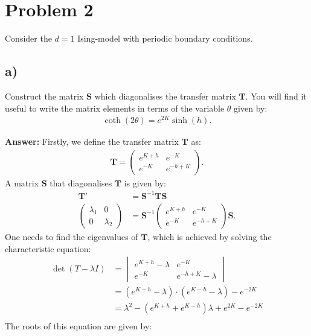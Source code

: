\documentclass[a4paper]{article}
\newcommand{\newparagraph}{\vspace{.5cm}\noindent}
\begin{document}
\section*{Problem 2}
Consider the $d = 1$ Ising-model with periodic boundary conditions.

\subsection*{a)}
Construct the matrix $\mathbf{S}$ which diagonalises the transfer matrix $\mathbf{T}$.
You will find it useful to write the matrix elements in terms of the variable $\theta$ given by:
\begin{align*}
    \coth(2\theta) = e^{2K}\sinh(h).
\end{align*}

\newparagraph
\textbf{Answer:} Firstly, we define the transfer matrix $\mathbf{T}$ as:
\begin{align*}
    \mathbf{T} = \begin{pmatrix}
        e^{K + h} & e^{-K}\\
        e^{-K}\ & e^{-h + K}
    \end{pmatrix}.
\end{align*}A matrix $\mathbf{S}$ that diagonalises $\mathbf{T}$ is given by:
\begin{align}
    \mathbf{T}' &= \mathbf{S}^{-1}\mathbf{T}\mathbf{S}\\
    \begin{pmatrix}
        \lambda_1 & 0\\
        0 & \lambda_2
    \end{pmatrix} &= \mathbf{S}^{-1}\begin{pmatrix}
        e^{K + h} & e^{-K}\\
        e^{-K}\ & e^{-h + K}
    \end{pmatrix}\mathbf{S}.\label{eq: diagonalise}
\end{align}One needs to find the eigenvalues of $\mathbf{T}$, which is achieved by solving the characteristic equation:
\begin{align*}
    \det\left(T - \lambda I\right) &= \begin{vmatrix}
        e^{K + h} - \lambda & e^{-K}\\
        e^{-K}\ & e^{-h + K} - \lambda
    \end{vmatrix}\\
    &=\left(e^{K + h} - \lambda\right)\cdot\left(e^{K - h} - \lambda\right) - e^{-2K}\\
    &= \lambda^2 - \left(e^{K + h} + e^{K - h}\right)\lambda + e^{2K} - e^{-2K}\\
\end{align*}The roots of this equation are given by:
\end{document}
